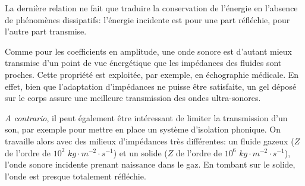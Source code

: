 \documentclass[a4paper, 12pt]{article}
\begin{document}
La dernière relation ne fait que traduire la conservation de l'énergie en l'absence de phénomènes dissipatifs: l'énergie incidente est pour une part réfléchie, pour l'autre part transmise.

Comme pour les coefficients en amplitude, une onde sonore est d'autant mieux transmise d'un point de vue énergétique que les impédances des fluides sont proches. Cette propriété est exploitée, par exemple, en échographie médicale. En effet, bien que l'adaptation d'impédances ne puisse être satisfaite, un gel déposé sur le corps assure une meilleure transmission des ondes ultra-sonores.

\textit{A contrario}, il peut également être intéressant de limiter la transmission d'un son, par exemple pour mettre en place un système d'isolation phonique. On travaille alors avec des milieux d'impédances très différentes: un fluide gazeux ($Z$ de l'ordre de $10^{2}$ $kg\cdot m^{-2}\cdot s^{-1}$) et un solide ($Z$ de l'ordre de $10^{6}$ $kg\cdot m^{-2}\cdot s^{-1}$), l'onde sonore incidente prenant naissance dans le gaz. En tombant sur le solide, l'onde est presque totalement réfléchie.

\newpage
\end{document}
